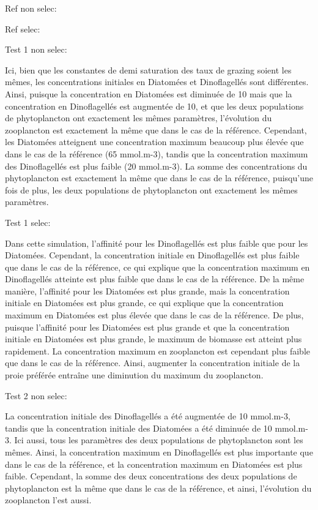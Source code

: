 Ref non selec:



Ref selec:


Test 1 non selec:

Ici, bien que les constantes de demi saturation des taux de grazing soient les mêmes, les concentrations initiales en Diatomées et Dinoflagellés sont différentes. Ainsi, puisque la concentration en Diatomées est diminuée de 10 mais que la concentration en Dinoflagellés est augmentée de 10, et que les deux populations de phytoplancton ont exactement les mêmes paramètres, l'évolution du zooplancton est exactement la même que dans le cas de la référence. Cependant, les Diatomées atteignent une concentration maximum beaucoup plus élevée que dans le cas de la référence (65 mmol.m-3), tandis que la concentration maximum des Dinoflagellés est plus faible (20 mmol.m-3). La somme des concentrations du phytoplancton est exactement la même que dans le cas de la référence, puisqu'une fois de plus, les deux populations de phytoplancton ont exactement les mêmes paramètres.

Test 1 selec: 

Dans cette simulation, l'affinité pour les Dinoflagellés est plus faible que pour les Diatomées. Cependant, la concentration initiale en Dinoflagellés est plus faible que dans le cas de la référence, ce qui explique que la concentration maximum en Dinoflagellés atteinte est plus faible que dans le cas de la référence.
De la même manière, l'affinité pour les Diatomées est plus grande, mais la concentration initiale en Diatomées est plus grande, ce qui explique que la concentration maximum en Diatomées est plus élevée que dans le cas de la référence.
De plus, puisque l'affinité pour les Diatomées est plus grande et que la concentration initiale en Diatomées est plus grande, le maximum de biomasse est atteint plus rapidement. 
La concentration maximum en zooplancton est cependant plus faible que dans le cas de la référence. Ainsi, augmenter la concentration initiale de la proie préférée entraîne une diminution du maximum du zooplancton. 

Test 2 non selec:

La concentration initiale des Dinoflagellés a été augmentée de 10 mmol.m-3, tandis que la concentration initiale des Diatomées a été diminuée de 10 mmol.m-3. Ici aussi, tous les paramètres des deux populations de phytoplancton sont les mêmes. Ainsi, la concentration maximum en Dinoflagellés est plus importante que dans le cas de la référence, et la concentration maximum en Diatomées est plus faible. Cependant, la somme des deux concentrations des deux populations de phytoplancton est la même que dans le cas de la référence, et ainsi, l'évolution du zooplancton l'est aussi.


